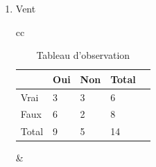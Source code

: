 \documentclass[a4paper, 11pt]{report}
\begin{document}
\begin{itemize}
\begin{enumerate}
\begin{table}[!h]
\begin{small}
\begin{tabular}{cc}
\begin{minipage}{.5\linewidth}
\begin{tabular}{| l | l | l | l | l |}
\hline
 & Oui & Non & Total\\
\hline
Haute & 3 & 4 & 7\\
\hline
Normal & 6 & 1 & 7 \\
\hline
Total & 9 & 5 & 14 \\
\hline
\end{tabular} 
      \caption{Tableau d'observation}

    \end{minipage} &

    \begin{minipage}{.5\linewidth}
\begin{tabular}{| l | l | l |}
\hline
 & Oui & Non\\
\hline
Haute & $\frac{7*9}{14} = 4.5$ & $\frac{7*5}{14} = 2.5$\\
\hline
Basse & $\frac{7*9}{14} = 4.5$ & $\frac{7*5}{14} = 2.5$ \\
\hline
\end{tabular} 
      \caption{Tableau d'estimation}
 
    \end{minipage} 
\end{tabular}
\end{small}
\end{table}

$X^2(Humidité) = \frac{(3-4.5)^2}{4.5}+\frac{(4-2.5)^2}{2.5}+\frac{(6-4.5)^2}{4.5}+\frac{(1-2.5)^2}{2.5}\\
X^2(Humidité) = 2.8$

\item Vent

\begin{table}[!h]
\begin{small}
\begin{tabular}{cc}

    \begin{minipage}{.5\linewidth}
   
\begin{tabular}{| l | l | l | l | l |}
\hline
 & Oui & Non & Total\\
\hline
Vrai & 3 & 3 & 6\\
\hline
Faux & 6 & 2 & 8 \\
\hline
Total & 9 & 5 & 14 \\
\hline
\end{tabular} 
      \caption{Tableau d'observation}

    \end{minipage} &


\end{tabular}
\end{small}
\end{table}
\end{enumerate}
\end{itemize}
\end{document}
